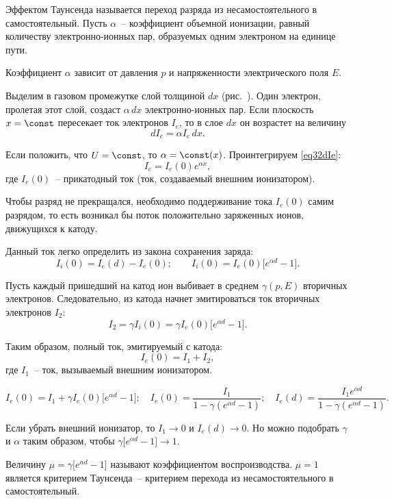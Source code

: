 Эффектом Таунсенда называется переход разряда из несамостоятельного в
самостоятельный. Пусть \( \alpha \)~-- коэффициент объемной ионизации, равный
количеству электронно-ионных пар, образуемых одним электроном на единице пути.

Коэффициент \( \alpha \) зависит от давления \( p \) и напряженности
электрического поля \( E \).

Выделим в газовом промежутке слой толщиной \( dx \) (рис.~).
Один электрон, пролетая этот слой, создаст \( \alpha\,dx \) электронно-ионных
пар. Если плоскость \( x = \const \) пересекает ток электронов \( I_e \), то в
слое \( dx \) он возрастет на величину
\begin{equation}
  dI_e = \alpha I_e\,dx.
  \label{eq32dIe}
\end{equation}

Если положить, что \( U = \const \), то \( \alpha = \const(x) \). Проинтегрируем
\eqref{eq32dIe}:
\[
  I_e = I_e(0)e^{\alpha x},
\]
где \( I_e(0) \)~-- прикатодный ток (ток, создаваемый внешним ионизатором).

Чтобы разряд не прекращался, необходимо поддерживание тока \( I_e(0) \) самим
разрядом, то есть возникал бы поток положительно заряженных ионов, движущихся к
катоду.

Данный ток легко определить из закона сохранения заряда:
\[
  I_i(0) = I_e(d) - I_e(0); \qquad I_i(0) = I_e(0) \Big[ e^{\alpha d} - 1 \Big].
\]

Пусть каждый пришедший на катод ион выбивает в среднем \( \gamma(p, E) \)
вторичных электронов. Следовательно, из катода начнет эмитироваться ток
вторичных электронов \( I_2 \):
\[
  I_2 = \gamma I_i(0) = \gamma I_e(0) \Big[ e^{\alpha d} - 1 \Big].
\]

Таким образом, полный ток, эмитируемый с катода:
\[
  I_e(0) = I_1 + I_2,
\]
где \( I_1 \)~-- ток, вызываемый внешним ионизатором.

\[
  I_e(0) = I_1 + \gamma I_e(0) \Big[ e^{\alpha d} - 1 \Big]; \quad
    I_e(0) = \frac{I_1}{1 - \gamma(e^{\alpha d} - 1)}; \quad
    I_e(d) = \frac{I_1 e^{\alpha d}}{1 - \gamma(e^{\alpha d} - 1)}.
\]

Если убрать внешний ионизатор, то \( I_1 \to 0 \) и \( I_e(d) \to 0 \). Но
можно подобрать \( \gamma \) и \( \alpha \) таким образом, чтобы
\(
  \gamma \Big[ e^{\alpha d} - 1 \Big] \to 1
\).

Величину \( \mu = \gamma \Big[ e^{\alpha d} - 1 \Big] \) называют коэффициентом
воспроизводства. \( \mu = 1 \) является критерием Таунсенда~-- критерием
перехода из несамостоятельного в самостоятельный.


